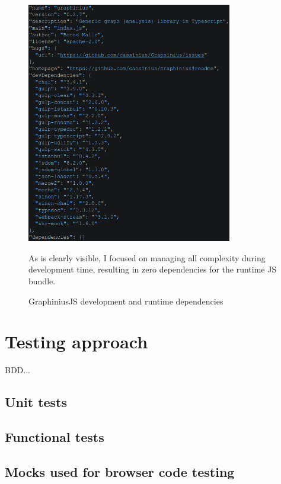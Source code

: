 \begin{figure}[ht]
	\label{fig_dependencies}
	\centering
	\hspace*{-0.5cm}
	\includegraphics[width=0.8\textwidth]{figures/package_deps}
	\caption{GraphiniusJS development and runtime dependencies}
	\small
	As is clearly visible, I focused on managing all complexity during development time, resulting in zero dependencies for the runtime JS bundle.
\end{figure}



\section{Testing approach}
\label{sect:testing_approach}

	BDD...
	
	\subsection{Unit tests}
	\label{ssect:unittests}
	
	\subsection{Functional tests}
	\label{ssect:func_tests}
	
	\subsection{Mocks used for browser code testing}
	\label{ssect:mocks}

